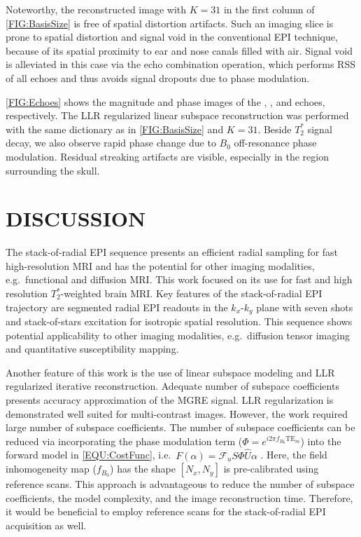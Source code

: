 \documentclass[a4paper,11pt]{article}
\begin{document}
Noteworthy, the reconstructed image with $K = 31$
in the first column of \cref{FIG:BasisSize} is free
of spatial distortion artifacts.
Such an imaging slice is prone to spatial distortion and signal void
in the conventional EPI technique, because of its spatial proximity to
ear and nose canals filled with air.
Signal void is alleviated in this case via the echo combination operation,
which performs RSS of all echoes
and thus avoids signal dropouts due to phase modulation.

\cref{FIG:Echoes} shows the magnitude and phase images
of the , , and  echoes, respectively.
The LLR regularized linear subspace reconstruction was performed with
the same dictionary as in \cref{FIG:BasisSize} and $K = 31$.
Beside $T_2^*$ signal decay, we also observe rapid phase change
due to $B_0$ off-resonance phase modulation.
Residual streaking artifacts are visible, especially in the region
surrounding the skull.

\section{DISCUSSION}

The stack-of-radial EPI sequence presents an efficient radial sampling
for fast high-resolution MRI and has the potential for other imaging modalities,
e.g.~functional and diffusion MRI.
This work focused on its use for fast and high resolution $T_2^*$-weighted brain MRI.
Key features of the stack-of-radial EPI trajectory are
segmented radial EPI readouts in the $k_x$-$k_y$ plane with seven shots
and stack-of-stars \cite{block_2014_rad} excitation for isotropic spatial resolution.
This sequence shows potential applicability to other imaging modalities,
e.g.~diffusion tensor imaging and quantitative susceptibility mapping.

Another feature of this work is the use of linear subspace modeling and
LLR regularized iterative reconstruction.
Adequate number of subspace coefficients presents accuracy approximation
of the MGRE signal. LLR regularization is demonstrated well suited for
multi-contrast images.
However, the work required large number of subspace coefficients.
The number of subspace coefficients can be reduced via
incorporating the phase modulation term ($\Phi = e^{i2\pi f_{B_0} \text{TE}_m}$)
into the forward model in \cref{EQU:CostFunc},
i.e.~$F(\alpha) = \mathcal{F}_u S \Phi \hat{U} \alpha$
\cite{dong_2020_epti_sub}.
Here, the field inhomogeneity map ($f_{B_0}$) has the shape $[N_x, N_y]$
is pre-calibrated using reference scans.
This approach is advantageous to reduce
the number of subspace coefficients, the model complexity,
and the image reconstruction time.
Therefore, it would be beneficial to employ reference scans
for the stack-of-radial EPI acquisition as well.
\end{document}
